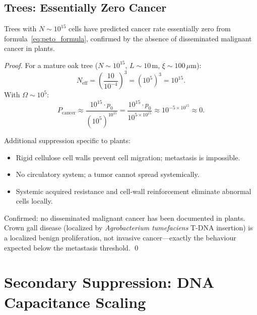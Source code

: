 \subsection{Trees: Essentially Zero Cancer}

\begin{proposition}
\label{prop:tree_cancer}
Trees with $N \sim 10^{15}$ cells have predicted cancer rate essentially zero
from formula~\eqref{eq:peto_formula}, confirmed by the absence of disseminated
malignant cancer in plants.
\end{proposition}

\begin{proof}
For a mature oak tree ($N \sim 10^{15}$, $L \sim 10\,\mathrm{m}$,
$\xi \sim 100\,\mu\mathrm{m}$):
\begin{equation}
  N_{\mathrm{eff}} = \left(\frac{10}{10^{-4}}\right)^3 = (10^5)^3 = 10^{15}.
\end{equation}
With $\Omega \sim 10^5$:
\begin{equation}
  P_{\mathrm{cancer}} \approx \frac{10^{15} \cdot p_0}{(10^5)^{10^{15}}}
  = \frac{10^{15} \cdot p_0}{10^{5 \times 10^{15}}} \approx 10^{-5 \times 10^{15}} \approx 0.
\end{equation}

Additional suppression specific to plants:
\begin{itemize}
  \item Rigid cellulose cell walls prevent cell migration; metastasis is impossible.
  \item No circulatory system; a tumor cannot spread systemically.
  \item Systemic acquired resistance and cell-wall reinforcement eliminate
        abnormal cells locally.
\end{itemize}
Confirmed: no disseminated malignant cancer has been documented in plants.
Crown gall disease (localized by \textit{Agrobacterium tumefaciens} T-DNA
insertion) is a localized benign proliferation, not invasive cancer---exactly
the behaviour expected below the metastasis threshold. \qed
\end{proof}

\section{Secondary Suppression: DNA Capacitance Scaling}
\label{sec:peto_genome}


